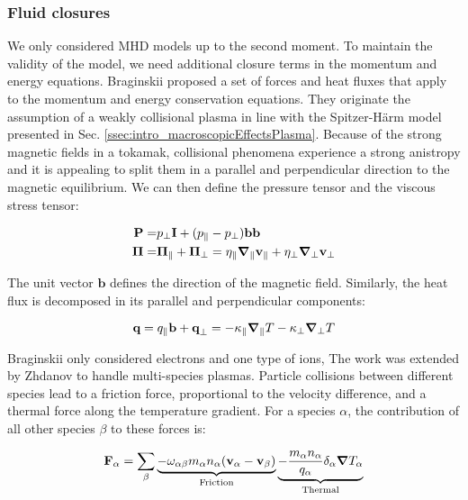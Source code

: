 \subsubsection{Fluid closures}
\label{sec:desc_fluidClosures}

We only considered MHD models up to the second moment. To maintain the validity of the model, we need additional closure terms in the momentum and energy equations. Braginskii\cite{braginskii1965transport} proposed a set of forces and heat fluxes that apply to the momentum and energy conservation equations. They originate the assumption of a weakly collisional plasma in line with the Spitzer-Härm model presented in Sec. \ref{ssec:intro_macroscopicEffectsPlasma}. Because of the strong magnetic fields in a tokamak, collisional phenomena experience a strong anistropy and it is appealing to split them in a parallel and perpendicular direction to the magnetic equilibrium. We can then define the pressure tensor and the viscous stress tensor:

\begin{align}
	\textbf{P} =& p_\perp\textbf{I} + (p_\parallel-p_\perp)\textbf{b}\textbf{b} \\
	\boldsymbol{\Pi} =& \boldsymbol{\Pi}_\parallel + \boldsymbol{\Pi}_\perp = \eta_\parallel\grad_\parallel \textbf{v}_\parallel + \eta_\perp\grad_\perp \textbf{v}_\perp
\end{align}

The unit vector $\textbf{b}$ defines the direction of the magnetic field. Similarly, the heat flux is decomposed in its parallel and perpendicular components:

\begin{equation}
	\textbf{q} = q_\parallel \textbf{b} + \textbf{q}_\perp = -\kappa_\parallel \grad_{\parallel}T - \kappa_\perp \grad_{\perp}T
\end{equation}

Braginskii only considered electrons and one type of ions, The work was extended by Zhdanov\cite{zhdanov2002transport} to handle multi-species plasmas. Particle collisions between different species lead to a friction force, proportional to the velocity difference, and a thermal force along the temperature gradient. For a species $\alpha$, the contribution of all other species $\beta$ to these forces is:

\begin{equation}
	\textbf{F}_\alpha  =\sum_\beta \underbrace{-\omega_{\alpha\beta}m_\alpha n_\alpha(\mathbf{v_\alpha}-\mathbf{v}_\beta)}_{\text{Friction}} \underbrace{-\frac{m_\alpha n_\alpha}{q_\alpha}\delta_\alpha\grad T_\alpha}_{\text{Thermal}}
\end{equation}

